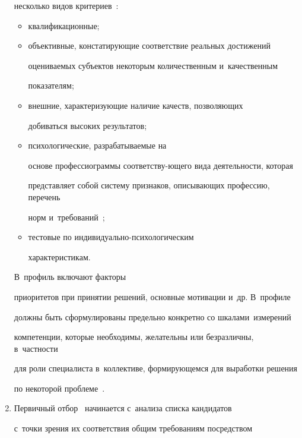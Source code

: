 \begin{multicols}{2}
\begin{enumerate}[1.]
несколько видов критериев~\cite{15-r}: 

\begin{itemize}

\item квалификационные; 

\item объективные, кон\-ста\-ти\-ру\-ющие соответствие реальных достижений 

оце\-ни\-ва\-емых субъектов некоторым количественным и~качественным 

показателям; 

\item внеш\-ние, ха\-рак\-те\-ри\-зу\-ющие наличие качеств, поз\-во\-ля\-ющих 

добиваться высоких результатов; 

\item психологические, раз\-ра\-ба\-ты\-ва\-емые на 

осно\-ве профессиограммы со\-от\-вет\-ст\-ву-\linebreak юще\-го вида дея\-тель\-ности, которая 

пред\-став\-ля\-ет собой сис\-те\-му при\-зна\-ков, опи\-сы\-ва\-ющих профессию, перечень 

норм и~\mbox{требований}~\cite{7-r}; 

\item тес\-то\-вые по ин\-ди\-ви\-ду\-аль\-но-пси\-хо\-ло\-ги\-че\-ским 

характеристикам.

\end{itemize}



 В~профиль включают факторы 

приоритетов при принятии решений, основные мотивации и~др. В~профиле 

долж\-ны быть сформулированы предельно конкретно со шкалами~измерений 

компетенции, которые необходимы, желательны или безразличны, в~част\-ности 

для роли специалиста в~коллективе, фор\-ми\-ру\-ющем\-ся для выработки решения 

по некоторой проб\-ле\-ме~\cite{6-r, 25-r}.\\[-14pt]

\item Первичный отбор~\cite{7-r} начинается с~анализа спис\-ка кандидатов 

с~точ\-ки зрения их соответствия общим требованиям по\-сред\-ст\-вом 


\end{enumerate}
\end{multicols}
